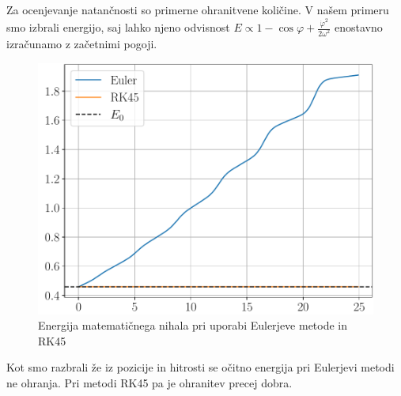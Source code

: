 \documentclass{article}
\begin{document}
\bigskip

Za ocenjevanje natančnosti so primerne ohranitvene količine. V našem primeru smo izbrali energijo, saj lahko njeno odvisnost $E \propto 1 - \cos{\varphi} + \frac{\dot{\varphi}^2}{2\omega^2}$ enostavno izračunamo z začetnimi pogoji. 
\begin{figure}[H]
	\centering
	\includegraphics[width=0.7\linewidth]{euler-rk45.pdf}
	\caption{Energija matematičnega nihala pri uporabi Eulerjeve metode in RK45}
\end{figure}
Kot smo razbrali že iz pozicije in hitrosti se očitno energija pri Eulerjevi metodi ne ohranja. Pri metodi RK45 pa je ohranitev precej dobra. 
\end{document}
